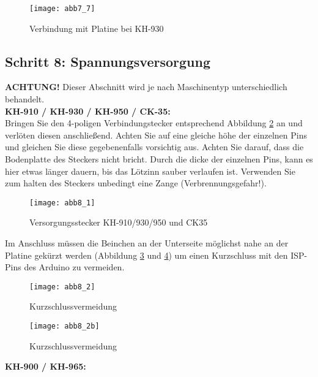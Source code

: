 \documentclass[fleqn,10pt]{SelfArx} %
\begin{document}
\begin{figure}[tbhp]\centering
\texttt{[image: abb7\_7]}
\caption{Verbindung mit Platine bei KH-930}
\label{fig:abb7_7}
\end{figure}

\FloatBarrier

 \subsection*{Schritt 8: Spannungsversorgung}

\textbf{ACHTUNG!} Dieser Abschnitt wird je nach Maschinentyp unterschiedlich behandelt.\\

\textbf{KH-910 / KH-930 / KH-950 / CK-35:} \\

Bringen Sie den 4-poligen Verbindungstecker entsprechend Abbildung \ref{fig:abb8_1} an und verlöten diesen anschließend. Achten Sie auf eine gleiche höhe der einzelnen Pins und gleichen Sie diese gegebenenfalls vorsichtig aus. Achten Sie darauf, dass die Bodenplatte des Steckers nicht bricht. Durch die dicke der einzelnen Pins, kann es hier etwas länger dauern, bis das Lötzinn sauber verlaufen ist. Verwenden Sie zum halten des Steckers unbedingt eine Zange (Verbrennungsgefahr!).

\begin{figure}[tbhp]\centering
\texttt{[image: abb8\_1]}
\caption{Versorgungsstecker KH-910/930/950 und CK35}
\label{fig:abb8_1}
\end{figure}

Im Anschluss müssen die Beinchen an der Unterseite möglichst nahe an der Platine gekürzt werden (Abbildung \ref{fig:abb8_2} und \ref{fig:abb8_2b}) um einen Kurzschluss mit den ISP-Pins des Arduino zu vermeiden.\par

\begin{figure}[tbhp]\centering
\texttt{[image: abb8\_2]}
\caption{Kurzschlussvermeidung}
\label{fig:abb8_2}
\end{figure}

\begin{figure}[tbhp]\centering
\texttt{[image: abb8\_2b]}
\caption{Kurzschlussvermeidung}
\label{fig:abb8_2b}
\end{figure}

\FloatBarrier

\textbf{KH-900 / KH-965:} \\
\end{document}

